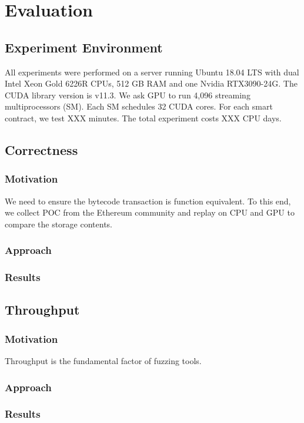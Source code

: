 \section{Evaluation}

\subsection{Experiment Environment}
All experiments were performed on a server running Ubuntu 18.04 LTS with dual Intel Xeon Gold 6226R CPUs, 512 GB RAM and one Nvidia RTX3090-24G.
The CUDA library version is v11.3.
%
We ask GPU to run 4,096 streaming multiprocessors (SM). Each SM schedules 32 CUDA cores. 
%
For each smart contract, we test XXX minutes. The total experiment costs XXX CPU days. 

\subsection{Correctness}
\label{rq:correctness}

\subsubsection{Motivation}
We need to ensure the bytecode transaction is function equivalent. To this end, we collect POC from the Ethereum community and replay on CPU and GPU to compare the storage contents. 
\subsubsection{Approach}

\subsubsection{Results}


\subsection{Throughput}
\label{rq:throughput}

\subsubsection{Motivation}
Throughput is the fundamental factor of fuzzing tools.

\subsubsection{Approach}

\subsubsection{Results}